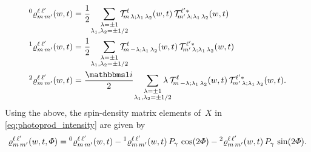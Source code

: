 \begin{align}
  \label{eq:photoprod_rho_0}
  \prescript{0}{}{\varrho}^{\ell\, \ell'}_{m\, m'}(w, t)
  ={}& \frac{1}{2}\quad \sum_{\substack{\lambda = \pm 1 \\ \mathclap{\lambda_1, \lambda_2 = \pm 1/2}}}
  \prodAmp^\ell_{\!m\, \lambda; \lambda_1\, \lambda_2}(w, t)\,
  \prodAmp^{\ell' *}_{\!m'\, \lambda; \lambda_1\, \lambda_2}(w, t)
  \\
  \label{eq:photoprod_rho_1}
  \prescript{1}{}{\varrho}^{\ell\, \ell'}_{m\, m'}(w, t)
  ={}& \frac{1}{2}\quad \sum_{\substack{\lambda = \pm 1 \\ \mathclap{\lambda_1, \lambda_2 = \pm 1/2}}}
  \prodAmp^\ell_{\!m\, {-\lambda}; \lambda_1\, \lambda_2}(w, t)\,
  \prodAmp^{\ell' *}_{\!m'\, \lambda; \lambda_1\, \lambda_2}(w, t)
  \\
  \label{eq:photoprod_rho_2}
  \prescript{2}{}{\varrho}^{\ell\, \ell'}_{m\, m'}(w, t)
  ={}& \frac{\imag}{2}\quad \sum_{\substack{\lambda = \pm 1 \\ \mathclap{\lambda_1, \lambda_2 = \pm 1/2}}}
  \lambda\,
  \prodAmp^\ell_{\!m\, {-\lambda}; \lambda_1\, \lambda_2}(w, t)\,
  \prodAmp^{\ell' *}_{\!m'\, \lambda; \lambda_1\, \lambda_2}(w, t).
\end{align}
Using the above, the spin-density matrix elements of~$X$ in
\cref{eq:photoprod_intensity} are given by
\begin{equation}
  \label{eq:photoprod_spin_dens_sum}
  \varrho^{\ell\, \ell'}_{m\, m'}(w, t, \Phi)
  = \prescript{0}{}{\varrho}^{\ell\, \ell'}_{m\, m'}(w, t)
  - \prescript{1}{}{\varrho}^{\ell\, \ell'}_{m\, m'}(w, t)\, P_\gamma\, \cos(2 \Phi)
  - \prescript{2}{}{\varrho}^{\ell\, \ell'}_{m\, m'}(w, t)\, P_\gamma\, \sin(2 \Phi).
\end{equation}

